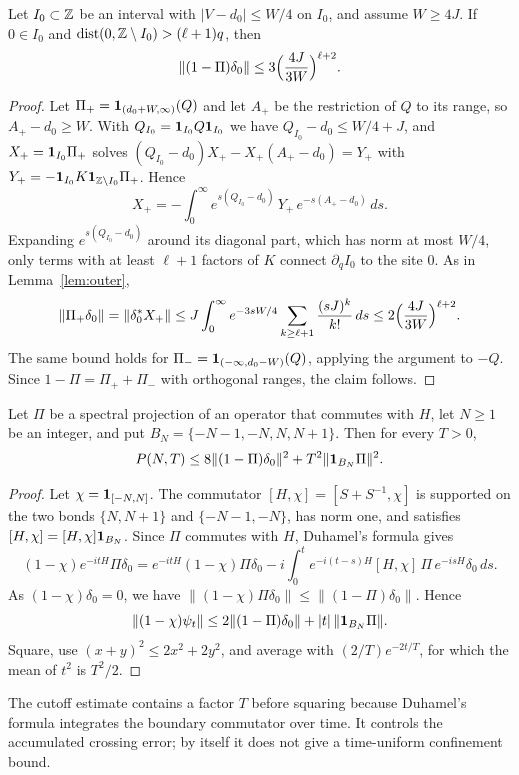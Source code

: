 \begin{lemma}\label{lem:inner}
Let $I_0\subset\mathbb Z$ be an interval with $|V-d_0|\le W/4$ on $I_0$, and assume $W\ge4J$. If $0\in I_0$ and $\operatorname{dist}(0,\mathbb Z\setminus I_0)>(\ell+1)q$, then
\[
\|(1-\Pi)\delta_0\|\le3\Bigl(\frac{4J}{3W}\Bigr)^{\ell+2}.
\]
\end{lemma}

\begin{proof}
Let $\Pi_+=\mathbf 1_{(d_0+W,\infty)}(Q)$ and let $A_+$ be the restriction of $Q$ to its range, so $A_+-d_0\ge W$. With $Q_{I_0}=\mathbf 1_{I_0}Q\mathbf 1_{I_0}$ we have $Q_{I_0}-d_0\le W/4+J$, and $X_+=\mathbf 1_{I_0}\Pi_+$ solves $(Q_{I_0}-d_0)X_+-X_+(A_+-d_0)=Y_+$ with $Y_+=-\mathbf 1_{I_0}K\mathbf 1_{\mathbb Z\setminus I_0}\Pi_+$. Hence
\[
X_+=-\int_0^\infty e^{s(Q_{I_0}-d_0)}\,Y_+\,e^{-s(A_+-d_0)}\,ds.
\]
Expanding $e^{s(Q_{I_0}-d_0)}$ around its diagonal part, which has norm at most $W/4$, only terms with at least $\ell+1$ factors of $K$ connect $\partial_qI_0$ to the site $0$. As in Lemma~\ref{lem:outer},
\[
\|\Pi_+\delta_0\|=\|\delta_0^*X_+\|\le J\int_0^\infty e^{-3sW/4}\sum_{k\ge\ell+1}\frac{(sJ)^k}{k!}\,ds\le2\Bigl(\frac{4J}{3W}\Bigr)^{\ell+2}.
\]
The same bound holds for $\Pi_-=\mathbf 1_{(-\infty,d_0-W)}(Q)$, applying the argument to $-Q$. Since $1-\Pi=\Pi_++\Pi_-$ with orthogonal ranges, the claim follows.
\end{proof}

\begin{lemma}[Cutoff]\label{lem:cutoff}
Let $\Pi$ be a spectral projection of an operator that commutes with $H$, let $N\ge1$ be an integer, and put $B_N=\{-N-1,-N,N,N+1\}$. Then for every $T>0$,
\[
P(N,T)\le8\|(1-\Pi)\delta_0\|^2+T^2\|\mathbf 1_{B_N}\Pi\|^2.
\]
\end{lemma}

\begin{proof}
Let $\chi=\mathbf 1_{[-N,N]}$. The commutator $[H,\chi]=[S+S^{-1},\chi]$ is supported on the two bonds $\{N,N+1\}$ and $\{-N-1,-N\}$, has norm one, and satisfies $[H,\chi]=[H,\chi]\mathbf 1_{B_N}$. Since $\Pi$ commutes with $H$, Duhamel's formula gives
\[
(1-\chi)e^{-itH}\Pi\delta_0=e^{-itH}(1-\chi)\Pi\delta_0-i\int_0^te^{-i(t-s)H}[H,\chi]\,\Pi\,e^{-isH}\delta_0\,ds.
\]
As $(1-\chi)\delta_0=0$, we have $\|(1-\chi)\Pi\delta_0\|\le\|(1-\Pi)\delta_0\|$. Hence
\[
\|(1-\chi)\psi_t\|\le2\|(1-\Pi)\delta_0\|+|t|\,\|\mathbf 1_{B_N}\Pi\|.
\]
Square, use $(x+y)^2\le2x^2+2y^2$, and average with $(2/T)e^{-2t/T}$, for which the mean of $t^2$ is $T^2/2$.
\end{proof}

The cutoff estimate contains a factor $T$ before squaring because Duhamel's formula integrates the boundary commutator over time. It controls the accumulated crossing error; by itself it does not give a time-uniform confinement bound.


